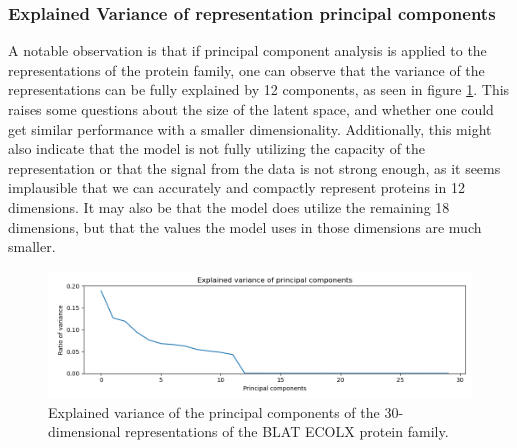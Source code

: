\subsubsection{Explained Variance of representation principal components}
A notable observation is that if principal component analysis is applied to the representations of the protein family, one can observe that the variance of the representations can be fully explained by 12 components, as seen in figure \ref{fig:explained_variance}. This raises some questions about the size of the latent space, and whether one could get similar performance with a smaller dimensionality. Additionally, this might also indicate that the model is not fully utilizing the capacity of the representation or that the signal from the data is not strong enough, as it seems implausible that we can accurately and compactly represent proteins in 12 dimensions. It may also be that the model does utilize the remaining 18 dimensions, but that the values the model uses in those dimensions are much smaller.
\begin{figure}[H]
    \centering
    \includegraphics[width = \linewidth]{report/figures/explained_variance.png}
    \caption{Explained variance of the principal components of the 30-dimensional representations of the BLAT ECOLX protein family.}
    \label{fig:explained_variance}
\end{figure}

